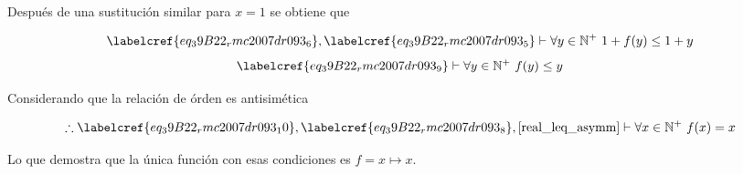 Después de una sustitución similar para $x = 1$ se obtiene que 

\begin{equation} \label{eq_39B22_rmc2007dr093_9}
	\labelcref{eq_39B22_rmc2007dr093_6}, \labelcref{eq_39B22_rmc2007dr093_5} \vdash \forall y \in \mathbb{N}^+\ 1 + f(y) \leq 1 + y
\end{equation}
\begin{equation} \label{eq_39B22_rmc2007dr093_10}
	\labelcref{eq_39B22_rmc2007dr093_9} \vdash \forall y \in \mathbb{N}^+\ f(y) \leq y
\end{equation}

Considerando que la relación de órden es antisimética 

\begin{equation} \label{eq_39B22_rmc2007dr093_11}
	\therefore \labelcref{eq_39B22_rmc2007dr093_10}, \labelcref{eq_39B22_rmc2007dr093_8}, \cref{real_leq_asymm} \vdash \forall x \in \mathbb{N}^+\ f(x) = x
\end{equation}

\vspace{1cm}
Lo que demostra que la única función con esas condiciones es $f = x \mapsto x$. \\\\\\
